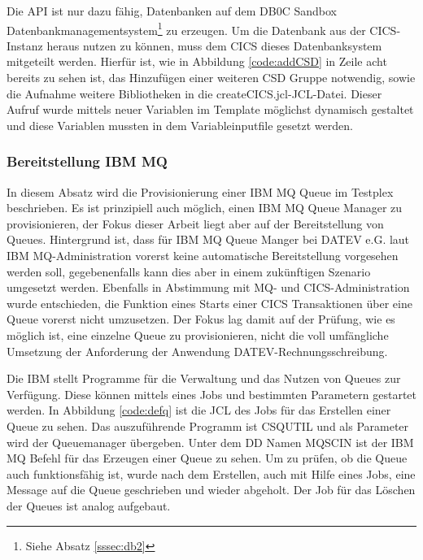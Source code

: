 Die API ist nur dazu fähig, Datenbanken auf dem DB0C Sandbox Datenbankmanagementsystem\footnote{Siehe Absatz \ref{sssec:db2}} zu erzeugen.
Um die Datenbank aus der CICS-Instanz heraus nutzen zu können, muss dem CICS dieses Datenbanksystem mitgeteilt werden.
Hierfür ist, wie in Abbildung \ref{code:addCSD} in Zeile acht bereits zu sehen ist, das Hinzufügen einer weiteren CSD Gruppe notwendig, sowie die Aufnahme weitere Bibliotheken in die \glqq createCICS.jcl\grqq-JCL-Datei.
Dieser Aufruf wurde mittels neuer Variablen im Template möglichst dynamisch gestaltet und diese Variablen mussten in dem Variableinputfile gesetzt werden.

\subsubsection{Bereitstellung IBM MQ}\label{sssec:mqtplx}
In diesem Absatz wird die Provisionierung einer IBM MQ Queue im Testplex beschrieben. 
Es ist prinzipiell auch möglich, einen IBM MQ Queue Manager zu provisionieren, der Fokus dieser Arbeit liegt aber auf der Bereitstellung von Queues. 
Hintergrund ist, dass für  IBM MQ Queue Manger bei DATEV e.G.  laut IBM MQ-Administration vorerst keine automatische Bereitstellung vorgesehen werden soll, gegebenenfalls kann dies aber in einem zukünftigen Szenario umgesetzt werden.
Ebenfalls in Abstimmung mit MQ- und CICS-Administration wurde entschieden, die Funktion eines Starts einer CICS Transaktionen über eine Queue vorerst nicht umzusetzen. Der Fokus lag damit auf der Prüfung, wie es möglich ist, eine einzelne Queue zu provisionieren, nicht die voll umfängliche Umsetzung der Anforderung der Anwendung DATEV-Rechnungsschreibung. 

Die IBM stellt Programme für die Verwaltung und das Nutzen von Queues  zur Verfügung.
Diese können mittels eines Jobs und bestimmten Parametern gestartet werden.
In Abbildung \ref{code:defq} ist die JCL des Jobs für das Erstellen einer Queue zu sehen.
Das auszuführende Programm ist \glqq CSQUTIL\grqq{} und als Parameter wird der Queuemanager übergeben.
Unter dem DD Namen \glqq MQSCIN\grqq{} ist der IBM MQ Befehl für das Erzeugen einer Queue zu sehen.
Um zu prüfen, ob die Queue auch funktionsfähig ist, wurde nach dem Erstellen, auch mit Hilfe eines Jobs, eine Message auf die Queue geschrieben und wieder abgeholt.
Der Job für das Löschen der Queues ist analog aufgebaut.

